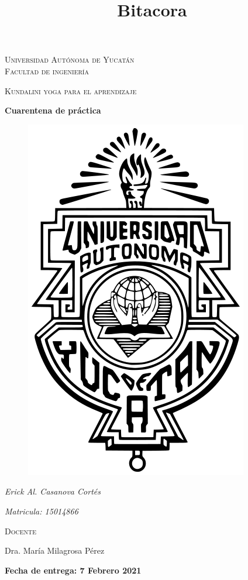 \documentclass[11pt]{report}
\theoremstyle{plain}
\theoremstyle{definition}
\begin{document}
\begin{titlepage}
\title{Bitacora}


	\centering
	{\scshape\LARGE Universidad Autónoma de Yucatán  \\ Facultad de ingeniería\par}
	\vspace{1cm}
	{\scshape\Large Kundalini yoga para el aprendizaje\par}
	\vspace{1.5cm}
	{\huge\bfseries Cuarentena de práctica\par}
	\vspace{0.7cm}
	{\begin{figure}[!h]
	\centering
    \includegraphics[scale=0.3]{UADY.png}
	\end{figure}}
	\vspace{0.7cm}
	{\Large\itshape Erick Al. Casanova Cortés\par}
	{\Large\itshape Matricula: 15014866\par}
	\vfill
	{\scshape\Large Docente\par
	Dra. María Milagrosa Pérez\par}
	\vfill
	{\Large{\bfseries Fecha de entrega: 7 Febrero 2021} }

	\vfill
	
\end{titlepage}
\end{document}
